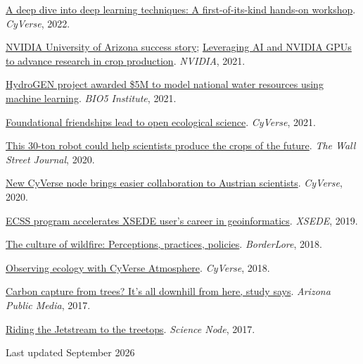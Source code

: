 \documentclass[11pt,letterpaper]{article}
\newenvironment{hanglist}
  {\begin{list}{}{\setlength{\leftmargin}{1.4em}\setlength{\itemindent}{-1.4em}%
     \setlength{\itemsep}{3pt}\setlength{\parsep}{0pt}\setlength{\topsep}{1pt}}}
  {\end{list}}
\begin{document}
\begin{hanglist}
\item \href{https://cyverse.org/deep_learning_workshop}{A deep dive into deep learning techniques: A first-of-its-kind hands-on workshop}. \textit{CyVerse}, 2022.
\item \href{https://resources.nvidia.com/en-us-ngc/ngc-uofa-success-story?lx=699wyX}{NVIDIA University of Arizona success story}; \href{https://www.youtube.com/watch?v=hanqTQui498}{Leveraging AI and NVIDIA GPUs to advance research in crop production}. \textit{NVIDIA}, 2021.
\item \href{https://bio5.org/news/hydrogen-project-awarded-5m-model-national-water-resources-using-machine-learning-1}{HydroGEN project awarded \$5M to model national water resources using machine learning}. \textit{BIO5 Institute}, 2021.
\item \href{https://cyverse.org/foundational-friendships-lead-to-open-ecological-science}{Foundational friendships lead to open ecological science}. \textit{CyVerse}, 2021.
\item \href{https://www.youtube.com/watch?v=da2gKRdMeXY}{This 30-ton robot could help scientists produce the crops of the future}. \textit{The Wall Street Journal}, 2020.
\item \href{https://cyverse.org/new-cyverse-node-brings-easier-collaboration-to-austrian-scientists}{New CyVerse node brings easier collaboration to Austrian scientists}. \textit{CyVerse}, 2020.
\item \href{https://www.xsede.org/-/ecss-program-accelerates-xsede-user-s-career-in-geoinformatics}{ECSS program accelerates XSEDE user's career in geoinformatics}. \textit{XSEDE}, 2019.
\item \href{https://borderlore.org/the-culture-of-wildfire-perceptions-practices-policies/}{The culture of wildfire: Perceptions, practices, policies}. \textit{BorderLore}, 2018.
\item \href{https://cyverse.org/Observing-Ecology-with-CyVerse-Atmosphere}{Observing ecology with CyVerse Atmosphere}. \textit{CyVerse}, 2018.
\item \href{https://www.azpm.org/s/49986-mountain-forests-capture-carbon-from-atmopshere/}{Carbon capture from trees? It's all downhill from here, study says}. \textit{Arizona Public Media}, 2017.
\item \href{https://sciencenode.org/feature/riding-the-jetstream-to-the-treetops.php}{Riding the Jetstream to the treetops}. \textit{Science Node}, 2017.
\end{hanglist}

\vfill
{\centering\footnotesize\color{muted}Last updated September 2026\par}
\end{document}
